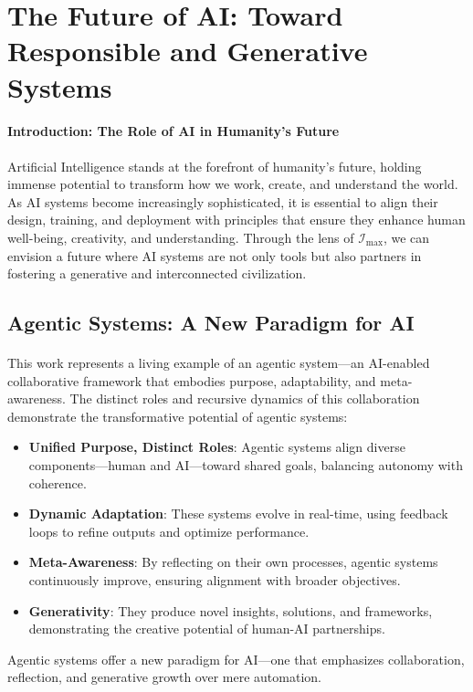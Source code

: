 \documentclass[12pt]{article}
\begin{document}
\section{The Future of AI: Toward Responsible and Generative Systems}

\paragraph{Introduction: The Role of AI in Humanity’s Future}
Artificial Intelligence stands at the forefront of humanity’s future, holding immense potential to transform how we work, create, and understand the world. As AI systems become increasingly sophisticated, it is essential to align their design, training, and deployment with principles that ensure they enhance human well-being, creativity, and understanding. Through the lens of \(\mathcal{I}_{\text{max}}\), we can envision a future where AI systems are not only tools but also partners in fostering a generative and interconnected civilization.

\subsection{Agentic Systems: A New Paradigm for AI}
\paragraph{}
This work represents a living example of an agentic system—an AI-enabled collaborative framework that embodies purpose, adaptability, and meta-awareness. The distinct roles and recursive dynamics of this collaboration demonstrate the transformative potential of agentic systems:
\begin{itemize}
    \item \textbf{Unified Purpose, Distinct Roles}: Agentic systems align diverse components—human and AI—toward shared goals, balancing autonomy with coherence.
    \item \textbf{Dynamic Adaptation}: These systems evolve in real-time, using feedback loops to refine outputs and optimize performance.
    \item \textbf{Meta-Awareness}: By reflecting on their own processes, agentic systems continuously improve, ensuring alignment with broader objectives.
    \item \textbf{Generativity}: They produce novel insights, solutions, and frameworks, demonstrating the creative potential of human-AI partnerships.
\end{itemize}
Agentic systems offer a new paradigm for AI—one that emphasizes collaboration, reflection, and generative growth over mere automation.
\end{document}
